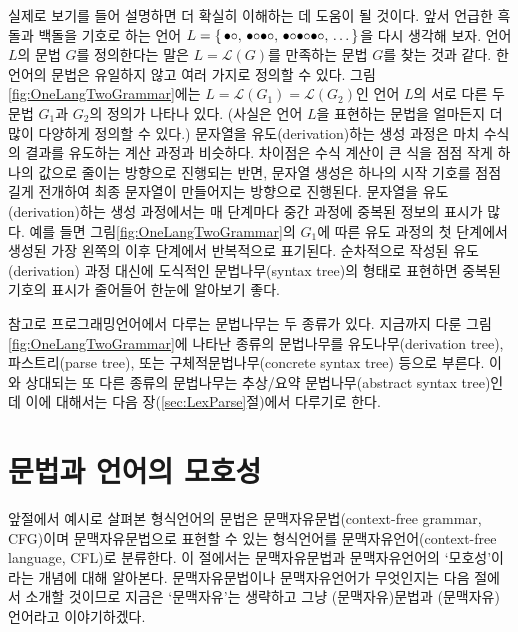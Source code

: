실제로 보기를 들어 설명하면 더 확실히 이해하는 데 도움이 될 것이다.
앞서 언급한 흑돌과 백돌을 기호로 하는 언어 
$L = \{\, \bullet\circ
      ,\, {\bullet\circ}{\bullet\circ}
      ,\, {\bullet\circ}{\bullet\circ}{\bullet\circ}
      ,\, \ldots
   \,\}$을 다시 생각해 보자.
언어 $L$의 문법 $G$를 정의한다는 말은 $L = \mathcal{L}(G)$를 만족하는 문법 $G$를 찾는
것과 같다. 한 언어의 문법은 유일하지 않고 여러 가지로 정의할 수 있다.
그림\;\ref{fig:OneLangTwoGrammar}에는 $L = \mathcal{L}(G_1) = \mathcal{L}(G_2)$인
언어 $L$의 서로 다른 두 문법 $G_1$과 $G_2$의 정의가 나타나 있다. (사실은
언어 $L$을 표현하는 문법을 얼마든지 더 많이 다양하게 정의할 수 있다.)
문자열을 유도(derivation)하는 생성 과정은 마치 수식의 결과를 유도하는
계산 과정과 비슷하다. 차이점은 수식 계산이 큰 식을 점점 작게 하나의 값으로
줄이는 방향으로 진행되는 반면, 문자열 생성은 하나의 시작 기호를 점점 길게
전개하여 최종 문자열이 만들어지는 방향으로 진행된다. 문자열을 유도(derivation)하는
생성 과정에서는 매 단계마다 중간 과정에 중복된 정보의 표시가 많다. 예를 들면
그림\;\ref{fig:OneLangTwoGrammar}의 $G_1$에 따른 유도 과정의 첫 단계에서
생성된 가장 왼쪽의  이후 단계에서 반복적으로 표기된다.
순차적으로 작성된 유도(derivation) 과정 대신에 도식적인
문법나무(syntax tree)의
형태로 표현하면 중복된 기호의 표시가 줄어들어 한눈에 알아보기 좋다.

%
%
%
%
%
%
%
참고로 프로그래밍언어에서 다루는 문법나무는 두 종류가 있다.
지금까지 다룬 그림\;\ref{fig:OneLangTwoGrammar}에 나타난 종류의 문법나무를
유도나무(derivation tree), 파스트리(parse tree), 또는
구체적문법나무(concrete syntax tree) 등으로 부른다.
이와 상대되는 또 다른 종류의 문법나무는
추상/요약 문법나무(abstract syntax tree)인데
이에 대해서는 다음 장(\ref{sec:LexParse}절)에서 다루기로 한다.

\section{문법과 언어의 모호성}
\label{sec:ambiguous}
%
%
앞절에서 예시로 살펴본 형식언어의 문법은 문맥자유문법(context-free grammar, CFG)이며
문맥자유문법으로 표현할 수 있는 형식언어를 문맥자유언어(context-free language, CFL)로
분류한다. 이 절에서는 문맥자유문법과 문맥자유언어의 `모호성'이라는 개념에 대해 알아본다.
문맥자유문법이나 문맥자유언어가 무엇인지는 다음 절에서 소개할 것이므로
지금은 `문맥자유'는 생략하고 그냥 (문맥자유)문법과 (문맥자유)언어라고 이야기하겠다.


